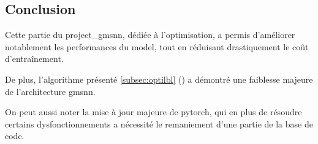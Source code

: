 \subsection{Conclusion}
Cette partie du \gls{project_gmsnn}, dédiée à l'optimisation, a permis d'améliorer notablement les performances du \gls{model}, tout en réduisant drastiquement le coût d'entraînement.%

De plus, l'algorithme présenté \autoref{subsec:optilbl} () a démontré une faiblesse majeure de l'architecture \gls{gmsnn}.

On peut aussi noter la mise à jour majeure de \gls{pytorch}, qui en plus de résoudre certains dysfonctionnements a nécessité le remaniement d'une partie de la base de code.
